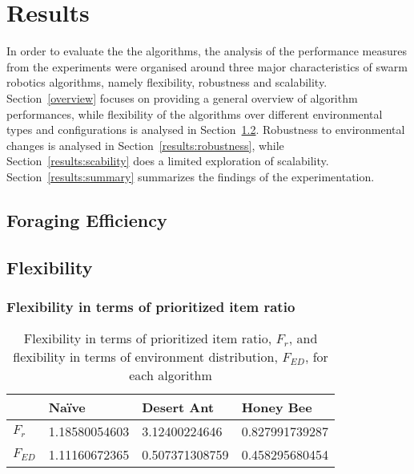 \chapter{Results}
\label{chap:results}



In order to evaluate the the algorithms, the analysis of the performance measures from the experiments were organised around three major characteristics of swarm robotics algorithms, namely flexibility, robustness and scalability. Section~\ref{overview} focuses on providing a general overview of algorithm performances, while flexibility of the algorithms over different environmental types and configurations is analysed in Section~\ref{results:flexibility}. Robustness to environmental changes is analysed in Section~\ref{results:robustness}, while Section~\ref{results:scability} does a limited exploration of scalability. Section~\ref{results:summary} summarizes the findings of the experimentation. 

\section{Foraging Efficiency}
\label{efficiency}




\section{Flexibility}
\label{results:flexibility}



\subsection{Flexibility in terms of prioritized item ratio}
\label{results:prioritizeditemratio}

\begin{table}[]
\centering
\caption{Flexibility in terms of prioritized item ratio, $F_r$, and flexibility in terms of environment distribution, $F_{ED}$, for each algorithm}
\label{table:flexibility}
\begin{tabular}{@{}llll@{}}
\toprule
\textbf{}         & Na\"ive         & Desert Ant        & Honey Bee         \\ \midrule
\textbf{$F_r$}    & 1.18580054603 & 3.12400224646     & 0.827991739287    \\ \midrule
\textbf{$F_{ED}$} & 1.11160672365 & 0.507371308759 & 0.458295680454 
\end{tabular}
\end{table}

